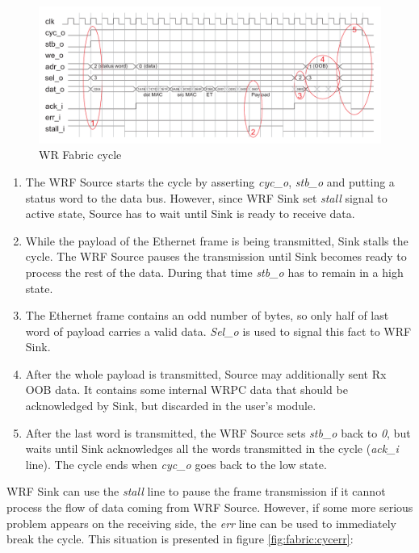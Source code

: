 \begin{figure}
  \begin{center}
    \includegraphics[width=\textwidth]{fig/basic_wrf_cycle.pdf}
    \caption{WR Fabric cycle}
    \label{fig:fabric:cyc}
  \end{center}
\end{figure}
\begin{enumerate}
  \item The WRF Source starts the cycle by asserting \emph{cyc\_o}, \emph{stb\_o}
    and putting a status word to the data bus. However, since WRF Sink set 
    \emph{stall} signal to active state, Source has to wait until Sink is ready
    to receive data.
  \item While the payload of the Ethernet frame is being transmitted, Sink
    stalls the cycle. The WRF Source pauses the transmission until Sink becomes
    ready to process the rest of the data. During that time \emph{stb\_o} has to
    remain in a high state.
  \item The Ethernet frame contains an odd number of bytes, so only half of last
    word of payload carries a valid data. \emph{Sel\_o} is used to signal this
    fact to WRF Sink.
  \item After the whole payload is transmitted, Source may additionally sent Rx
    OOB data. It contains some internal WRPC data that should be acknowledged
    by Sink, but discarded in the user's module.
  \item After the last word is transmitted, the WRF Source sets \emph{stb\_o} back
    to \emph{0}, but waits until Sink acknowledges all the words transmitted in
    the cycle (\emph{ack\_i} line). The cycle ends when \emph{cyc\_o} goes back
    to the low state.
\end{enumerate}

WRF Sink can use the \emph{stall} line to pause the frame transmission if it cannot
process the flow of data coming from WRF Source. However, if some more serious
problem appears on the receiving side, the \emph{err} line can be used to
immediately break the cycle. This situation is presented in figure
\ref{fig:fabric:cycerr}:

